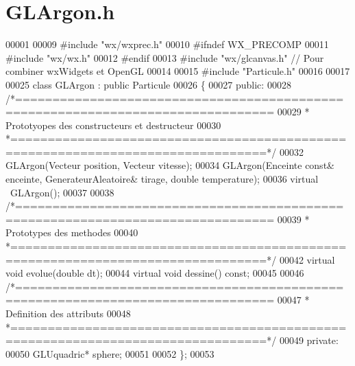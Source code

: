 \section{G\+L\+Argon.\+h}
\label{_g_l_argon_8h_source}

\begin{DoxyCode}
00001 
00009 \textcolor{preprocessor}{#include "wx/wxprec.h"}
00010 \textcolor{preprocessor}{#ifndef WX\_PRECOMP}
00011 \textcolor{preprocessor}{#include "wx/wx.h"}
00012 \textcolor{preprocessor}{#endif}
00013 \textcolor{preprocessor}{#include "wx/glcanvas.h"} \textcolor{comment}{// Pour combiner wxWidgets et OpenGL}
00014 
00015 \textcolor{preprocessor}{#include "Particule.h"}
00016 
00017 
00025 \textcolor{keyword}{class }GLArgon : \textcolor{keyword}{public} Particule
00026 \{
00027     \textcolor{keyword}{public}:
00028 \textcolor{comment}{/*================================================================================}
00029 \textcolor{comment}{ * Prototyopes des constructeurs et destructeur}
00030 \textcolor{comment}{ *================================================================================*/}
00032     GLArgon(Vecteur position, Vecteur vitesse);
00034     GLArgon(Enceinte \textcolor{keyword}{const}& enceinte, GenerateurAleatoire& tirage, \textcolor{keywordtype}{double} temperature);
00036     \textcolor{keyword}{virtual} ~GLArgon();
00037     
00038 \textcolor{comment}{/*================================================================================}
00039 \textcolor{comment}{ * Prototypes des methodes}
00040 \textcolor{comment}{ *================================================================================*/}
00042     \textcolor{keyword}{virtual} \textcolor{keywordtype}{void} evolue(\textcolor{keywordtype}{double} dt);
00044     \textcolor{keyword}{virtual} \textcolor{keywordtype}{void} dessine() \textcolor{keyword}{const};
00045     
00046 \textcolor{comment}{/*================================================================================}
00047 \textcolor{comment}{ * Definition des attributs}
00048 \textcolor{comment}{ *================================================================================*/}
00049     \textcolor{keyword}{private}:
00050     GLUquadric* sphere;
00051 
00052 \};
00053 
\end{DoxyCode}
